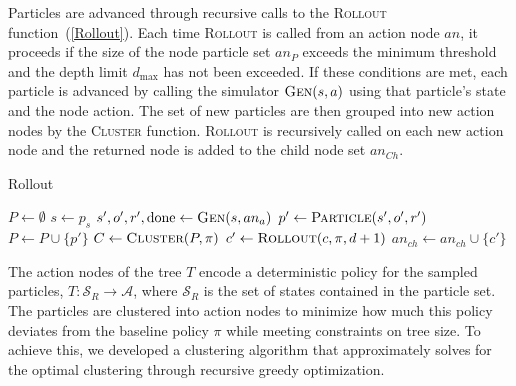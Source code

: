 \documentclass[letterpaper]{article} %
\begin{document}
Particles are advanced through recursive calls to the \textsc{Rollout} function~(\cref{Rollout}). 
Each time \textsc{Rollout} is called from an action node $an$, it proceeds if the size of the node particle set $an_P$ exceeds the minimum threshold and the depth limit $d_{\max}$ has not been exceeded.
If these conditions are met, each particle is advanced by calling the simulator $\textsc{Gen}(s, a)$ using that particle's state and the node action. 
The set of new particles are then grouped into new action nodes by the \textsc{Cluster} function.
\textsc{Rollout} is recursively called on each new action node and the returned node is added to the child node set $an_{Ch}$.
\begin{algorithm}[ht]
\caption{Rollout}\label{Rollout} 
\begin{algorithmic}[1]
            \State $P \gets \emptyset$
                \State $s \gets p_s$
                \State $s', o', r', \text{done} \gets \textsc{Gen}(s, an_a)$ 
                    \State $p' \gets \textsc{Particle}(s', o', r')$
                    \State $P \gets P \cup \{ p' \}$
                \EndIf
            \EndFor
            \State $C \gets \textsc{Cluster}(P, \pi)$
                \State $c' \gets \textsc{Rollout}(c, \pi, d + 1)$
                \State $an_{ch} \gets an_{ch} \cup \{ c' \}$
            \EndFor
        \EndIf
        \State \Return {}
    \EndProcedure
\end{algorithmic}
\end{algorithm}

The action nodes of the tree $T$ encode a deterministic policy for the sampled particles, $T: \mathcal{S}_R \to \mathcal{A}$, where $\mathcal{S}_R$ is the set of states contained in the particle set. 
The particles are clustered into action nodes to minimize how much this policy deviates from the baseline policy $\pi$ while meeting constraints on tree size. 
To achieve this, we developed a clustering algorithm that approximately solves for the optimal clustering through recursive greedy optimization.
\end{document}
